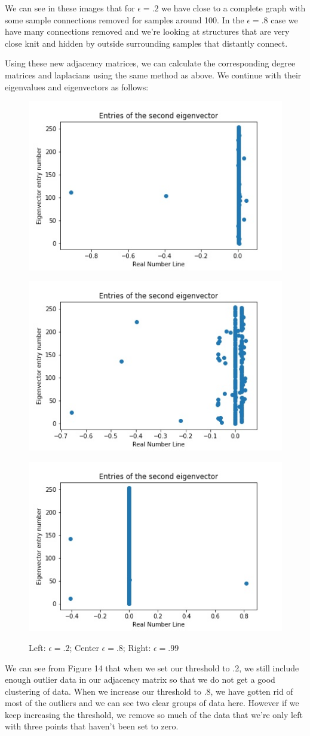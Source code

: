 \documentclass{article}
\theoremstyle{definition} \newtheorem*{lte}{Definition}
\theoremstyle{plain} \newtheorem*{csbt}{Theorem}
\begin{document}
We can see in these images that for $\epsilon = .2$ we have close to a complete graph with some sample connections removed for samples around 100. In the $\epsilon = .8$ case we have many connections removed and we're looking at structures that are very close knit and hidden by outside surrounding samples that distantly connect. 

Using these new adjacency matrices, we can calculate the corresponding degree matrices and laplacians using the same method as above. We continue with their eigenvalues and eigenvectors as follows: 

\begin{figure}[H]
\begin{center}
\begin{subfloat}{
\includegraphics[width = .3\linewidth]{Eigvector2.jpg}
}\end{subfloat}
\begin{subfloat}{
\includegraphics[width = .3\linewidth]{Eigvector8.jpg}
}\end{subfloat}
\begin{subfloat}{
\includegraphics[width = .3\linewidth]{EigvectorEmpty.jpg}
}\end{subfloat}
\caption{Left: $\epsilon = .2$; Center $\epsilon = .8$; Right: $\epsilon = .99$}
\end{center}
\end{figure}

We can see from Figure 14 that when we set our threshold to .2, we still include enough outlier data in our adjacency matrix so that we do not get a good clustering of data. When we increase our threshold to .8, we have gotten rid of most of the outliers and we can see two clear groups of data here. However if we keep increasing the threshold, we remove so much of the data that we're only left with three points that haven't been set to zero. 
\end{document}
